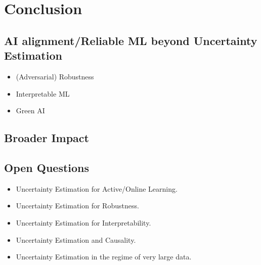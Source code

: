 \chapter{Conclusion}
\label{chap:conclusion}

\section{AI alignment/Reliable ML beyond Uncertainty Estimation}

\begin{itemize}
\item (Adversarial) Robustness
\item Interpretable ML
\item Green AI
\end{itemize}

\section{Broader Impact}

\section{Open Questions}

\begin{itemize}
\item Uncertainty Estimation for Active/Online Learning.
\item Uncertainty Estimation for Robustness.
\item Uncertainty Estimation for Interpretability.
\item Uncertainty Estimation and Causality.
\item Uncertainty Estimation in the regime of very large data.
\end{itemize}